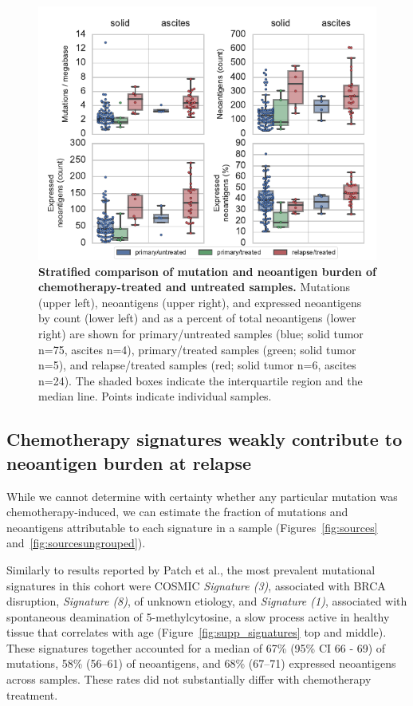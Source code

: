 \begin{figure}
\centering
\includegraphics[scale=1.0]{figures/counts.pdf}
\caption{\textbf{Stratified comparison of mutation and neoantigen burden of chemotherapy-treated and untreated samples.} Mutations (upper left), neoantigens (upper right), and expressed neoantigens by count (lower left) and as a percent of total neoantigens (lower right) are shown for primary/untreated samples (blue; solid tumor n=75, ascites n=4), primary/treated samples (green; solid tumor n=5), and relapse/treated samples (red; solid tumor n=6, ascites n=24). The shaded boxes indicate the interquartile region and the median line. Points indicate individual samples.}
\label{fig:counts}
\end{figure}

\subsection*{Chemotherapy signatures weakly contribute to neoantigen burden at relapse}


While we cannot determine with certainty whether any particular mutation was chemotherapy-induced, we can estimate the fraction of mutations and neoantigens attributable to each signature in a sample (Figures~\ref{fig:sources} and~\ref{fig:sourcesungrouped}).

Similarly to results reported by Patch et al., the most prevalent mutational signatures in this cohort were COSMIC \textit{Signature (3)}, associated with BRCA disruption, \textit{Signature (8)}, of unknown etiology, and \textit{Signature (1)}, associated with spontaneous deamination of 5-methylcytosine, a slow process active in healthy tissue that correlates with age (Figure~\ref{fig:supp_signatures} top and middle). These signatures together accounted for a median of 67\% (95\% CI 66 - 69) of mutations, 58\% (56--61) of neoantigens, and 68\% (67--71) expressed neoantigens across samples. These rates did not substantially differ with chemotherapy treatment.

